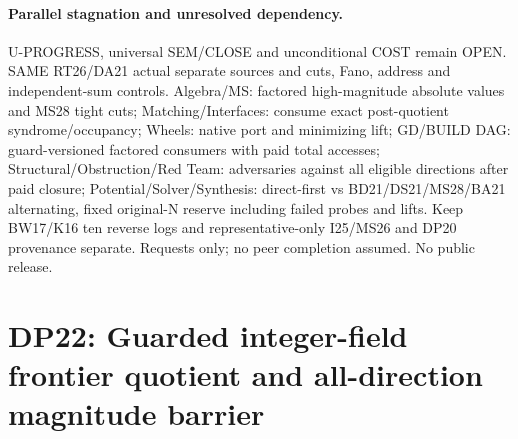 \documentclass[11pt]{article}
\begin{document}
\paragraph{Parallel stagnation and unresolved dependency.}
U-PROGRESS, universal SEM/CLOSE and unconditional COST remain OPEN. SAME RT26/DA21 actual separate sources and cuts, Fano, address and independent-sum controls. Algebra/MS: factored high-magnitude absolute values and MS28 tight cuts; Matching/Interfaces: consume exact post-quotient syndrome/occupancy; Wheels: native port and minimizing lift; GD/BUILD DAG: guard-versioned factored consumers with paid total accesses; Structural/Obstruction/Red Team: adversaries against all eligible directions after paid closure; Potential/Solver/Synthesis: direct-first vs BD21/DS21/MS28/BA21 alternating, fixed original-N reserve including failed probes and lifts. Keep BW17/K16 ten reverse logs and representative-only I25/MS26 and DP20 provenance separate. Requests only; no peer completion assumed. No public release.


\section{DP22: Guarded integer-field frontier quotient and all-direction magnitude barrier}\label{sec:dp22}
\end{document}
